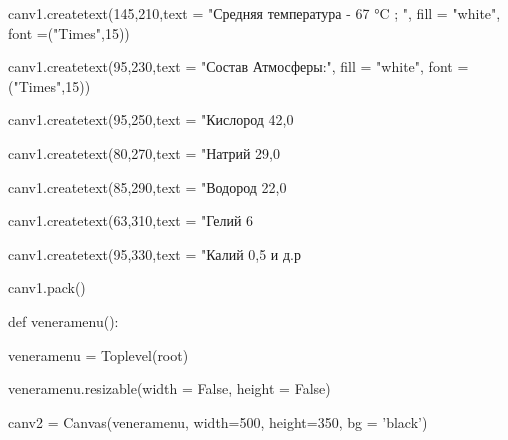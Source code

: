 \documentclass[14pt, oneside]{SavkinSeliverstov}
\begin{document}
	canv\underline{\hspace{0.2cm}}1.create\underline{\hspace{0.2cm}}text(145,210,text = "Средняя температура - 67 °C ; ", fill = "white", font =("Times",15))
	
	canv\underline{\hspace{0.2cm}}1.create\underline{\hspace{0.2cm}}text(95,230,text = "Состав Атмосферы:", fill = "white", font =("Times",15))
	
	canv\underline{\hspace{0.2cm}}1.create\underline{\hspace{0.2cm}}text(95,250,text = "Кислород 42,0%

	canv\underline{\hspace{0.2cm}}1.create\underline{\hspace{0.2cm}}text(80,270,text = "Натрий 29,0%

	canv\underline{\hspace{0.2cm}}1.create\underline{\hspace{0.2cm}}text(85,290,text = "Водород 22,0%
	
	canv\underline{\hspace{0.2cm}}1.create\underline{\hspace{0.2cm}}text(63,310,text = "Гелий 6%

	canv\underline{\hspace{0.2cm}}1.create\underline{\hspace{0.2cm}}text(95,330,text = "Калий 0,5 и д.р %

	canv\underline{\hspace{0.2cm}}1.pack()

def venera\underline{\hspace{0.2cm}}menu():
	
	venera\underline{\hspace{0.2cm}}menu = Toplevel(root)
	
	venera\underline{\hspace{0.2cm}}menu.resizable(width = False, height = False)
	
	canv\underline{\hspace{0.2cm}}2 = Canvas(venera\underline{\hspace{0.2cm}}menu, width=500, height=350, bg = 'black')
	
\end{document}
